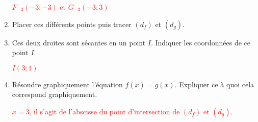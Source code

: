 \begin{corrige}
\begin{enumerate}
        \textcolor{red}{$F_{-3}(-3;-3)$ et $G_{-3}(-3;3)$}
        \item Placer ces différents points puis tracer $(d_f)$ et $(d_g)$.
        \item Ces deux droites sont sécantes en un point $I$. Indiquer les coordonnées de ce point $I$.
        
        \textcolor{red}{$I(3;1)$}
        \item Résoudre graphiquement l'équation $f(x)=g(x)$. Expliquer ce à quoi cela correspond graphiquement.
        
        \textcolor{red}{$x=3$, il s'agit de l'abscisse du point d'intersection de $(d_f)$ et $(d_g)$.}
    \end{enumerate}
\end{corrige}
